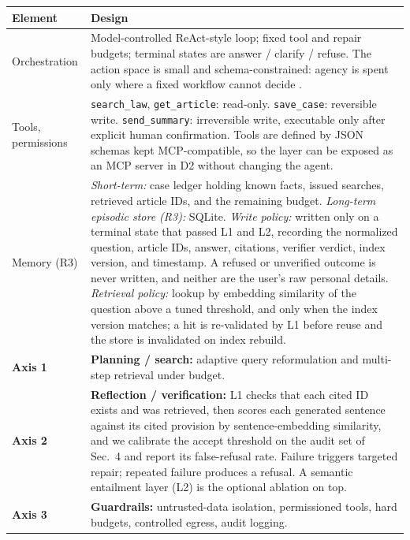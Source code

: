 \vspace{-8pt}
{\small
\noindent
\begin{tabularx}{\textwidth}{@{} >{\raggedright\arraybackslash}p{2.2cm} X @{}}
\toprule
\textbf{Element} & \textbf{Design} \\
\midrule
Orchestration & Model-controlled ReAct-style loop; fixed tool and repair budgets; terminal states are answer / clarify / refuse. The action space is small and schema-constrained: agency is spent only where a fixed workflow cannot decide \citep{anthropic2024agents}. \\
Tools, permissions & \texttt{search\_law}, \texttt{get\_article}: read-only. \texttt{save\_case}: reversible write. \texttt{send\_summary}: irreversible write, executable only after explicit human confirmation. Tools are defined by JSON schemas kept MCP-compatible, so the layer can be exposed as an MCP server in D2 without changing the agent. \\
Memory (R3) & \emph{Short-term:} case ledger holding known facts, issued searches, retrieved article IDs, and the remaining budget. \emph{Long-term episodic store (R3):} SQLite. \emph{Write policy:} written only on a terminal state that passed L1 and L2, recording the normalized question, article IDs, answer, citations, verifier verdict, index version, and timestamp. A refused or unverified outcome is never written, and neither are the user's raw personal details. \emph{Retrieval policy:} lookup by embedding similarity of the question above a tuned threshold, and only when the index version matches; a hit is re-validated by L1 before reuse and the store is invalidated on index rebuild. \\
\textbf{Axis 1} & \textbf{Planning / search:} adaptive query reformulation and multi-step retrieval under budget. \\
\textbf{Axis 2} & \textbf{Reflection / verification:} L1 checks that each cited ID exists and was retrieved, then scores each generated sentence against its cited provision by sentence-embedding similarity, and we calibrate the accept threshold on the audit set of Sec.~4 and report its false-refusal rate. Failure triggers targeted repair; repeated failure produces a refusal. A semantic entailment layer (L2) is the optional ablation on top. \\
\textbf{Axis 3} & \textbf{Guardrails:} untrusted-data isolation, permissioned tools, hard budgets, controlled egress, audit logging. \\
\bottomrule
\end{tabularx}
}

